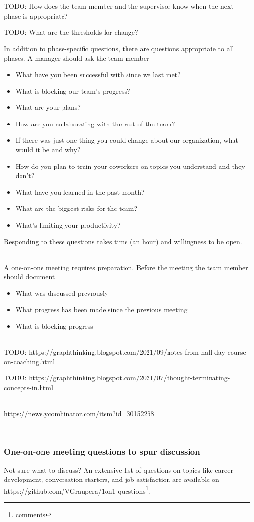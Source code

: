 TODO: How does the team member and the supervisor know when the next phase is appropriate?

TODO: What are the thresholds for change?

In addition to phase-specific questions, there are questions appropriate to all phases. A manager should ask the team member
\begin{itemize}
    \item What have you been successful with since we last met?
    \item What is blocking our team's progress?
    \item What are your plans?
    \item How are you collaborating with the rest of the team?
    \item If there was just one thing you could change about our organization, what would it be and why?
    \item How do you plan to train your coworkers on topics you understand and they don't?
    \item What have you learned in the past month?
    \item What are the biggest risks for the team?
    \item What's limiting your productivity?
\end{itemize}
Responding to these questions takes time (an hour) and willingness to be open. 


\ \\

A one-on-one meeting requires preparation. Before the meeting the team member should document
\begin{itemize}
    \item What was discussed previously
    \item What progress has been made since the previous meeting
    \item What is blocking progress
\end{itemize}

\ \\

TODO: https://graphthinking.blogspot.com/2021/09/notes-from-half-day-course-on-coaching.html

TODO: https://graphthinking.blogspot.com/2021/07/thought-terminating-concepts-in.html

\ \\

https://news.ycombinator.com/item?id=30152268

\ \\

\subsubsection{One-on-one meeting questions to spur discussion}

Not sure what to discuss? An extensive list of questions on topics like career development, conversation starters, and job satisfaction are available on \href{https://github.com/VGraupera/1on1-questions}{https://github.com/VGraupera/1on1-questions}\footnote{\href{https://news.ycombinator.com/item?id=22341138}{comments}}.